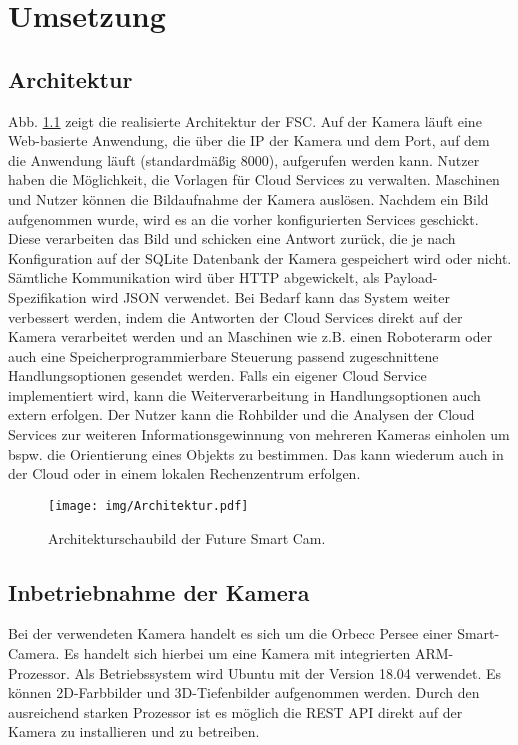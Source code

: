 \chapter{Umsetzung\label{cha:chapter4}}
\section{Architektur}
Abb. \ref{img:Architektur} zeigt die realisierte Architektur der FSC. Auf der Kamera läuft eine Web-basierte Anwendung, die über die IP der Kamera und dem Port, auf dem die Anwendung läuft (standardmäßig 8000), aufgerufen werden kann. Nutzer haben die Möglichkeit, die Vorlagen für Cloud Services zu verwalten. Maschinen und Nutzer können die Bildaufnahme der Kamera auslösen. Nachdem ein Bild aufgenommen wurde, wird es an die vorher konfigurierten Services geschickt. Diese verarbeiten das Bild und schicken eine Antwort zurück, die je nach Konfiguration auf der SQLite Datenbank der Kamera gespeichert wird oder nicht. Sämtliche Kommunikation wird über HTTP abgewickelt, als Payload-Spezifikation wird JSON verwendet. Bei Bedarf kann das System weiter verbessert werden, indem die Antworten der Cloud Services direkt auf der Kamera verarbeitet werden und an Maschinen wie z.B. einen Roboterarm oder auch eine Speicherprogrammierbare Steuerung passend zugeschnittene Handlungsoptionen gesendet werden. Falls ein eigener Cloud Service implementiert wird, kann die Weiterverarbeitung in Handlungsoptionen auch extern erfolgen. Der Nutzer kann die Rohbilder und die Analysen der Cloud Services zur weiteren Informationsgewinnung von mehreren Kameras einholen um bspw. die Orientierung eines Objekts zu bestimmen. Das kann wiederum auch in der Cloud oder in einem lokalen Rechenzentrum erfolgen.
\begin{figure}[]
\texttt{[image: img/Architektur.pdf]}
\caption{Architekturschaubild der Future Smart Cam.}
\label{img:Architektur}
\end{figure}
\newline

\section{Inbetriebnahme der Kamera}
Bei der verwendeten Kamera handelt es sich um die Orbecc Persee einer Smart-Camera. Es handelt sich hierbei um eine Kamera mit integrierten ARM-Prozessor. Als Betriebssystem wird Ubuntu mit der Version 18.04 verwendet. Es können 2D-Farbbilder und 3D-Tiefenbilder aufgenommen werden. Durch den ausreichend starken Prozessor ist es möglich die REST API direkt auf der Kamera zu installieren und zu betreiben.

